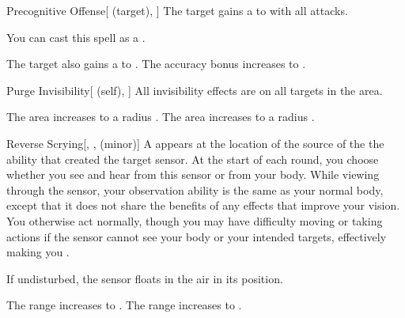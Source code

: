 \lowercase{\hypertarget{spell:Precognitive Offense}{}}\label{spell:Precognitive Offense}
\begin{attuneability}[Rank 3]{\hypertarget{spell:Precognitive Offense}{Precognitive Offense}}[ (target), ]
The target gains a   to  with all attacks.

You can cast this spell as a .

\rankline
{} The target also gains a   to .
 The accuracy bonus increases to .
\end{attuneability}
\vspace{0.25em}



\lowercase{\hypertarget{spell:Purge Invisibility}{}}\label{spell:Purge Invisibility}
\begin{attuneability}[Rank 3]{\hypertarget{spell:Purge Invisibility}{Purge Invisibility}}[ (self), ]
All invisibility effects are  on all targets in the area.

\rankline
{} The area increases to a \areahuge radius .
 The area increases to a \areaext radius .
\end{attuneability}
\vspace{0.25em}



\lowercase{\hypertarget{spell:Reverse Scrying}{}}\label{spell:Reverse Scrying}
\begin{freeability}[Rank 3]{\hypertarget{spell:Reverse Scrying}{Reverse Scrying}}[, ,  (minor)]
A  appears at the location of the source of the the ability that created the target sensor.
At the start of each round, you choose whether you see and hear from this sensor or from your body.
While viewing through the sensor, your observation ability is the same as your normal body, except that it does not share the benefits of any  effects that improve your vision.
You otherwise act normally, though you may have difficulty moving or taking actions if the sensor cannot see your body or your intended targets, effectively making you \blinded.

If undisturbed, the sensor floats in the air in its position.

\rankline
{} The range increases to \rnglong.
 The range increases to \rngext.
\end{freeability}
\vspace{0.25em}



